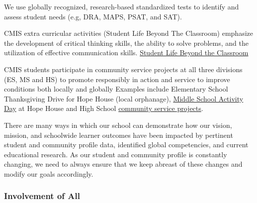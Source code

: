 \begin{findings}
We use globally recognized, research-based standardized tests to identify and assess student needs (e.g, DRA, MAPS, PSAT, and SAT). 

CMIS extra curricular activities (Student Life Beyond The Classroom) emphasize the development of critical thinking skills, the ability to solve problems, and the utilization of effective communication skills. \href{http://blogs.cmis.ac.th/eagles/}{Student Life Beyond the Classroom}

CMIS students participate in community service projects at all three divisions (ES, MS and HS) to promote responsibly in action and service to improve conditions both locally and globally Examples include Elementary School Thanksgiving Drive for Hope House (local orphanage), \href{https://drive.google.com/a/cmis.ac.th/file/d/0B7jcj1TRcFEGNEtqR3hUSW5QVHM/view?usp=sharing}{Middle School Activity Day} at Hope House and High School \href{http://blogs.cmis.ac.th/community-service/}{community service projects}.


There are many ways in which our school can demonstrate how our vision, mission, and schoolwide learner outcomes have been impacted by pertinent student and community profile data, identified global competencies, and current educational research. 
As our student and community profile is constantly changing, we need to always ensure that we keep abreast of these changes and modify our goals accordingly.
\end{findings}


\subsubsection{Involvement of All}



